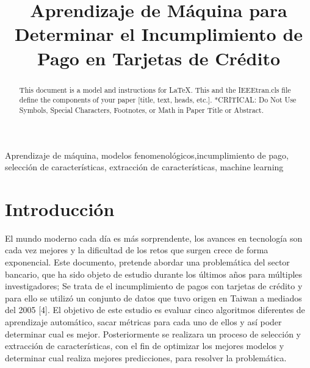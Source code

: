\documentclass[conference]{IEEEtran}
\begin{document}
\title{Aprendizaje de Máquina para Determinar el Incumplimiento de Pago en Tarjetas de Crédito
}
\author{
\and
{}
}

\maketitle

\begin{abstract}
This document is a model and instructions for \LaTeX.
This and the IEEEtran.cls file define the components of your paper [title, text, heads, etc.]. *CRITICAL: Do Not Use Symbols, Special Characters, Footnotes, 
or Math in Paper Title or Abstract.
\end{abstract}

 
\begin{IEEEkeywords}
Aprendizaje de máquina, modelos fenomenológicos,incumplimiento de pago, selección de características, extracción de características, machine learning
\end{IEEEkeywords}

\section{Introducción}
El mundo moderno cada día es más sorprendente, los avances en tecnología son cada vez mejores y la dificultad de los retos que surgen crece de forma exponencial. Este documento, pretende abordar una problemática del sector bancario, que ha sido objeto de estudio durante los últimos años para múltiples investigadores; Se trata de el incumplimiento de pagos con tarjetas de crédito y para ello se utilizó un conjunto de datos que tuvo origen en Taiwan a mediados del 2005 [4]. El objetivo de este estudio es evaluar cinco algoritmos diferentes de aprendizaje automático, sacar métricas para cada uno de ellos y así poder determinar cual es mejor. Posteriormente se realizara un proceso de selección y extracción de características, con el fin de optimizar los mejores modelos y determinar cual realiza mejores predicciones, para resolver la problemática.  
\end{document}
